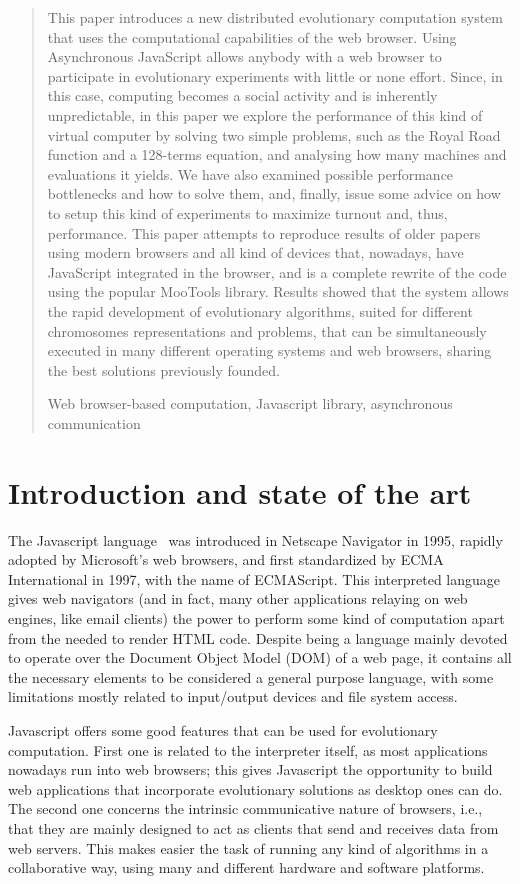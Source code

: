 \documentclass[runningheads,a4paper]{llncs}
\newcommand{\keywords}[1]{\par\addvspace\baselineskip
\noindent\keywordname\enspace\ignorespaces#1}
\begin{document}
\begin{abstract}
This paper introduces a new distributed evolutionary computation system that uses the computational capabilities of the web browser. Using Asynchronous JavaScript allows anybody with a web browser
to participate in evolutionary experiments with little or none effort. Since, in
this case, computing becomes a social activity and is inherently unpredictable, in this paper we explore the performance of this kind of virtual computer by solving two simple problems, such as the Royal Road function and a 128-terms equation, and analysing how many machines and evaluations it yields. We have also examined possible performance bottlenecks
and how to solve them, and, finally, issue some advice on how to setup
this kind of experiments to maximize turnout and, thus, performance.
This paper attempts to reproduce results of older papers using modern
browsers and all kind of devices that, nowadays, have JavaScript integrated in the browser, and is a complete rewrite of the code using the popular MooTools library. 
Results showed that the system allows the rapid development of evolutionary algorithms, suited for different chromosomes representations and problems, that can be simultaneously executed in many different operating systems and web browsers, sharing the best solutions previously founded.
\keywords{Web browser-based computation, Javascript library, asynchronous communication}
\end{abstract}


\section{Introduction and state of the art}
\label{sec:intro}
The Javascript language~\cite{javascript} was introduced in Netscape Navigator in 1995, rapidly adopted by Microsoft's web browsers, and first standardized  by ECMA International in 1997, with the name of ECMAScript. This interpreted language gives web navigators (and in fact, many other applications relaying on web engines, like email clients) the power to perform some kind of computation apart from the needed to render HTML code. Despite being a language mainly devoted to operate over the Document Object Model (DOM) of a web page, it contains all the necessary elements to be considered a general purpose language, with some limitations mostly related to input/output devices and file system access.

Javascript offers some good features that can be used for evolutionary computation. First one is related to the interpreter itself, as most applications nowadays run into web browsers; this gives Javascript the opportunity to build web applications that incorporate evolutionary solutions as desktop ones can do. The second one concerns the intrinsic communicative nature of browsers, i.e., that they are mainly designed to act as clients that send and receives data from web servers. This makes easier the task of running any kind of algorithms in a collaborative way, using many and different hardware and software platforms. 
\end{document}
